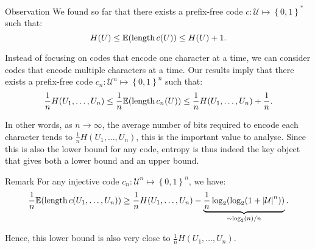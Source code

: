\documentclass[a4paper]{article}
\begin{document}
\begin{parag}{Observation}
    We found so far that there exists a prefix-free code $c: \mathcal{U} \mapsto \left\{0, 1\right\}^*$ such that: 
    \[H\left(U\right) \leq \exval\left(\length c\left(U\right)\right) \leq H\left(U\right) + 1.\]
    
    Instead of focusing on codes that encode one character at a time, we can consider codes that encode multiple characters at a time. Our results imply that there exists a prefix-free code $c_n: \mathcal{U}^n \mapsto \left\{0, 1\right\}^n$ such that: 
    \[\frac{1}{n} H\left(U_1, \ldots, U_n\right) \leq \frac{1}{n} \exval\left(\length c_n\left(U\right)\right) \leq \frac{1}{n}H\left(U_1, \ldots, U_n\right) + \frac{1}{n}.\]

    In other words, as $n \to \infty$, the average number of bits required to encode each character tends to $\frac{1}{n} H\left(U_1, \ldots, U_n\right)$, this is the important value to analyse. Since this is also the lower bound for any code, entropy is thus indeed the key object that gives both a lower bound and an upper bound.

    \begin{subparag}{Remark}
        For any injective code $c_n: \mathcal{U}^n \mapsto \left\{0, 1\right\}^n$, we have: 
        \[\frac{1}{n} \exval\left(\length c\left(U_1, \ldots, U_n\right)\right) \geq \frac{1}{n} H\left(U_1, \ldots, U_n\right) - \underbrace{\frac{1}{n} \log_2\left(\log_2\left(1 + \left|\mathcal{U}\right|^n\right)\right)}_{\sim \log_2\left(n\right) / n}.\]
        
        Hence, this lower bound is also very close to $\frac{1}{n} H\left(U_1, \ldots, U_n\right)$.
    \end{subparag}
\end{parag}
\end{document}
